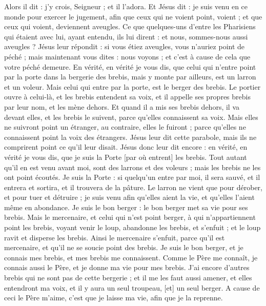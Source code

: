 \begin{multicols}{2}
Alors il dit : j'y crois, Seigneur ; et il l'adora.
Et Jésus dit : je suis venu en ce monde pour exercer le jugement, afin que ceux qui ne voient point, voient ; et que ceux qui voient, deviennent aveugles.
Ce que quelques-uns d'entre les Pharisiens qui étaient avec lui, ayant entendu, ils lui dirent : et nous, sommes-nous aussi aveugles ?
Jésus leur répondit : si vous étiez aveugles, vous n'auriez point de péché ; mais maintenant vous dites : nous voyons ; et c'est à cause de cela que votre péché demeure.
\VerseOne{}En vérité, en vérité je vous dis, que celui qui n'entre point par la porte dans la bergerie des brebis, mais y monte par ailleurs, est un larron et un voleur.
Mais celui qui entre par la porte, est le berger des brebis.
Le portier ouvre à celui-là, et les brebis entendent sa voix, et il appelle ses propres brebis par leur nom, et les mène dehors.
Et quand il a mis ses brebis dehors, il va devant elles, et les brebis le suivent, parce qu'elles connaissent sa voix.
Mais elles ne suivront point un étranger, au contraire, elles le fuiront ; parce qu'elles ne connaissent point la voix des étrangers.
Jésus leur dit cette parabole, mais ils ne comprirent point ce qu'il leur disait.
Jésus donc leur dit encore : en vérité, en vérité je vous dis, que je suis la Porte [par où entrent] les brebis.
Tout autant qu'il en est venu avant moi, sont des larrons et des voleurs ; mais les brebis ne les ont point écoutés.
Je suis la Porte : si quelqu'un entre par moi, il sera sauvé, et il entrera et sortira, et il trouvera de la pâture.
Le larron ne vient que pour dérober, et pour tuer et détruire ; je suis venu afin qu'elles aient la vie, et qu'elles l'aient même en abondance.
Je suis le bon berger : le bon berger met sa vie pour ses brebis.
Mais le mercenaire, et celui qui n'est point berger, à qui n'appartiennent point les brebis, voyant venir le loup, abandonne les brebis, et s'enfuit ; et le loup ravit et disperse les brebis.
Ainsi le mercenaire s'enfuit, parce qu'il est mercenaire, et qu'il ne se soucie point des brebis.
Je suis le bon berger, et je connais mes brebis, et mes brebis me connaissent.
Comme le Père me connaît, je connais aussi le Père, et je donne ma vie pour mes brebis.
J'ai encore d'autres brebis qui ne sont pas de cette bergerie ; et il me les faut aussi amener, et elles entendront ma voix, et il y aura un seul troupeau, [et] un seul berger.
A cause de ceci le Père m'aime, c'est que je laisse ma vie, afin que je la reprenne.

\end{multicols}
